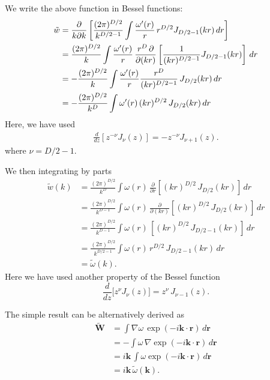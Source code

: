 \documentclass[aip,jcp,reprint,superscriptaddress]{revtex4-1}
\numberwithin{equation}{subsection}
\newcommand{\vct}[1]{\mathbf{#1}}
\providecommand{\vr}{} %
\renewcommand{\vr}{\vct{r}}
\newcommand{\vk}{\vct{k}}
\begin{document}
We write the above function in Bessel functions:
\begin{align}
  \tilde{w}
&=
\frac{\partial}{k\partial k}
\left[
\frac{(2\pi)^{D/2}}{k^{D/2-1}}
\int \frac{\omega'(r)}{r} \, r^{D/2} J_{D/2-1}(kr) \, dr
\right]
\notag \\
&=
\frac{(2\pi)^{D/2}}{k}
\int
\frac{\omega'(r)}{r}
\,
\frac{r^D \, \partial}{\partial (kr)}
\left[
\frac{1}{(kr)^{D/2-1}}
  J_{D/2-1}(kr)
\right]
\, dr
\notag \\
&=
-
\frac{(2\pi)^{D/2}}{k}
\int
\frac{\omega'(r)}{r}
\frac{r^D}
{
(kr)^{D/2-1}
}
\, J_{D/2}(kr) \, dr
\notag \\
&=
-
\frac{(2\pi)^{D/2}}{k^D}
\int
\omega'(r) \, (kr)^{D/2}
\, J_{D/2}(kr) \, dr
\label{eq:wbessel1}
\end{align}
Here, we have used
\begin{align*}
  \frac{d}{dz} [z^{-\nu} J_\nu(z)] = -z^{-\nu} J_{\nu+1}(z).
\end{align*}
where $\nu = D/2-1$.


We then integrating by parts
\begin{align*}
\tilde{w}(k)
&=
\frac{(2\pi)^{D/2}}{k^D}
\int
\omega(r) \,
\frac{\partial }{\partial r}
\left[
  (kr)^{D/2}
  \, J_{D/2}(kr)
\right]
\, dr
\\
&=
\frac{(2\pi)^{D/2}}{k^{D-1}}
\int
\omega(r) \,
\frac{\partial }{\partial (kr)}
\left[
  (kr)^{D/2}
  \, J_{D/2}(kr)
\right]
\, dr
\\
&=
\frac{(2\pi)^{D/2}}{k^{D-1}}
\int
\omega(r) \,
\left[
  (kr)^{D/2}
  \, J_{D/2-1}(kr)
\right]
\, dr
\\
&=
\frac{(2\pi)^{D/2}}{k^{D/2-1}}
\int
\omega(r) \,
  r^{D/2}
  \, J_{D/2-1}(kr)
\, dr
\\
&=\tilde\omega(k).
\end{align*}
Here we have used another property of the Bessel function
\[
  \frac{d}{dz} \Big[ z^\nu J_\nu(z) \Big]
=
  z^\nu \, J_{\nu - 1}(z).
\]

The simple result can be alternatively derived as
\begin{align*}
  \tilde{\vct{W}}
&=
\int \nabla \omega \, \exp(-i\vk \cdot \vr) \, d\vr
\\
&=
-\int \omega \, \nabla \exp(-i\vk \cdot \vr) \, d\vr
\\
&=
i \vk \, \int \omega \exp(-i\vk \cdot \vr) \, d\vr
\\
&=
i \vk \, \tilde{\omega}(\vk).
\end{align*}
\end{document}
